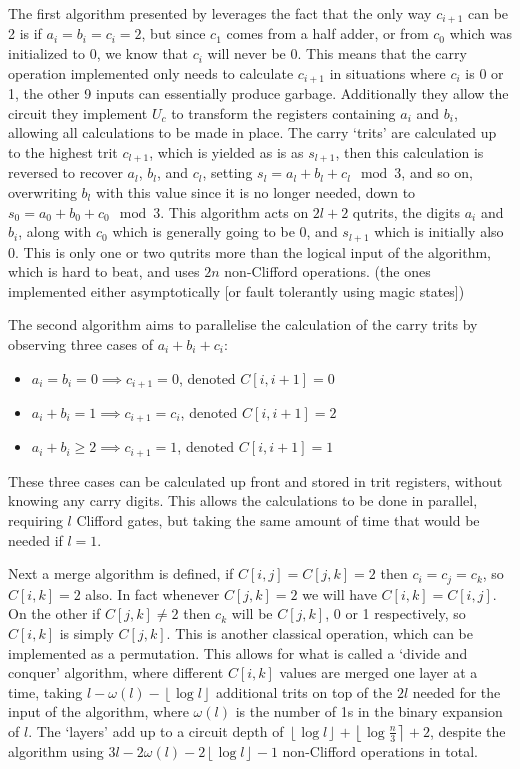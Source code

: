The first algorithm presented by \cite{arithmetics} leverages the fact that the only way $c_{i+1}$ can be 2 is if $a_i = b_i = c_i = 2$, but since $c_1$ comes from a half adder, or from $c_0$ which was initialized to 0, we know that $c_i$ will never be 0. This means that the carry operation implemented only needs to calculate $c_{i+1}$ in situations where $c_i$ is 0 or 1, the other 9 inputs can essentially produce garbage. Additionally they allow the circuit they implement $U_c$ to transform the registers containing $a_i$ and $b_i$, allowing all calculations to be made in place. The carry `trits' are calculated up to the highest trit $c_{l+1}$, which is yielded as is as $s_{l+1}$, then this calculation is reversed to recover $a_l$, $b_l$, and $c_l$, setting $s_l = a_l + b_l + c_l \mod 3$, and so on, overwriting $b_l$ with this value since it is no longer needed, down to $s_0 = a_0 + b_0 + c_0 \mod 3$. This algorithm acts on $2l+2$ qutrits, the digits $a_i$ and $b_i$, along with $c_0$ which is generally going to be 0, and $s_{l+1}$ which is initially also 0. This is only one or two qutrits more than the logical input of the algorithm, which is hard to beat, and uses $2n$ non-Clifford operations. (the ones implemented either asymptotically [or fault tolerantly using magic states])

The second algorithm aims to parallelise the calculation of the carry trits by observing three cases of $a_i + b_i + c_i$:
\begin{itemize}
	\item $a_i = b_i = 0 \implies c_{i+1} = 0$, denoted $C[i, i+1] = 0$
	\item $a_i + b_i = 1 \implies c_{i+1} = c_i$, denoted $C[i, i+1] = 2$
	\item $a_i + b_i \geq 2 \implies c_{i+1} = 1$, denoted $C[i, i+1] = 1$
\end{itemize}
These three cases can be calculated up front and stored in trit registers, without knowing any carry digits. This allows the calculations to be done in parallel, requiring $l$ Clifford gates, but taking the same amount of time that would be needed if $l = 1$.

Next a merge algorithm is defined, if $C[i, j] = C[j, k] = 2$ then $c_i = c_j = c_k$, so $C[i, k] = 2$ also. In fact whenever $C[j, k] = 2$ we will have $C[i, k] = C[i, j]$. On the other if $C[j, k] \neq 2$ then $c_k$ will be $C[j, k]$, 0 or 1 respectively, so $C[i, k]$ is simply $C[j, k]$. This is another classical operation, which can be implemented as a permutation. This allows for what is called a `divide and conquer' algorithm, where different $C[i, k]$ values are merged one layer at a time, taking $l - \omega(l) - \left\lfloor \log l \right\rfloor$ additional trits on top of the $2l$ needed for the input of the algorithm, where $\omega(l)$ is the number of 1s in the binary expansion of $l$. The `layers' add up to a circuit depth of $\left\lfloor \log l \right\rfloor + \left\lfloor \log \frac{n}{3} \right\rceil + 2$, despite the algorithm using $3l - 2\omega(l) - 2\left\lfloor \log l \right\rfloor - 1$ non-Clifford operations in total.

